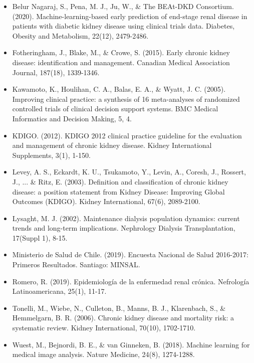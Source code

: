 \documentclass{article}
\begin{document}
\begin{itemize}
    \item Belur Nagaraj, S., Pena, M. J., Ju, W., \& The BEAt-DKD Consortium. (2020). Machine-learning-based early prediction of end-stage renal disease in patients with diabetic kidney disease using clinical trials data. Diabetes, Obesity and Metabolism, 22(12), 2479-2486.
    \item Fotheringham, J., Blake, M., \& Crowe, S. (2015). Early chronic kidney disease: identification and management. Canadian Medical Association Journal, 187(18), 1339-1346.
    \item Kawamoto, K., Houlihan, C. A., Balas, E. A., \& Wyatt, J. C. (2005). Improving clinical practice: a synthesis of 16 meta-analyses of randomized controlled trials of clinical decision support systems. BMC Medical Informatics and Decision Making, 5, 4.
    \item KDIGO. (2012). KDIGO 2012 clinical practice guideline for the evaluation and management of chronic kidney disease. Kidney International Supplements, 3(1), 1-150.
    \item Levey, A. S., Eckardt, K. U., Tsukamoto, Y., Levin, A., Coresh, J., Rossert, J., ... \& Ritz, E. (2003). Definition and classification of chronic kidney disease: a position statement from Kidney Disease: Improving Global Outcomes (KDIGO). Kidney International, 67(6), 2089-2100.
    \item Lysaght, M. J. (2002). Maintenance dialysis population dynamics: current trends and long-term implications. Nephrology Dialysis Transplantation, 17(Suppl 1), 8-15.
    \item Ministerio de Salud de Chile. (2019). Encuesta Nacional de Salud 2016-2017: Primeros Resultados. Santiago: MINSAL.
    \item Romero, R. (2019). Epidemiología de la enfermedad renal crónica. Nefrología Latinoamericana, 25(1), 11-17.
    \item Tonelli, M., Wiebe, N., Culleton, B., Manns, B. J., Klarenbach, S., \& Hemmelgarn, B. R. (2006). Chronic kidney disease and mortality risk: a systematic review. Kidney International, 70(10), 1702-1710.
    \item Wuest, M., Bejnordi, B. E., \& van Ginneken, B. (2018). Machine learning for medical image analysis. Nature Medicine, 24(8), 1274-1288.
\end{itemize}
\newpage
\end{document}
